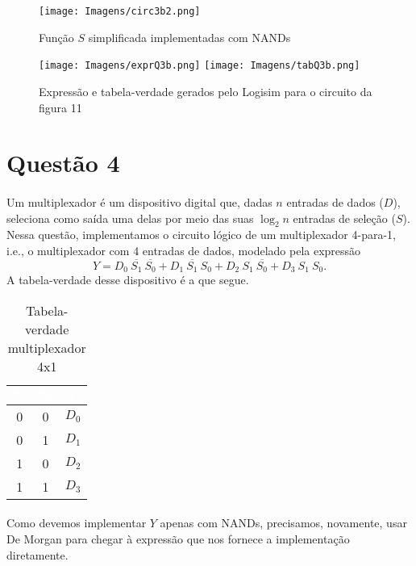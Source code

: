 \documentclass[a4paper, 12pt]{article}
\begin{document}
\begin{figure}[H]
    \centering
    \texttt{[image: Imagens/circ3b2.png]}
    \caption{Função $S$ simplificada implementadas com NANDs}
\end{figure}

\begin{figure}[H]
    \centering
    \texttt{[image: Imagens/exprQ3b.png]}
    \texttt{[image: Imagens/tabQ3b.png]} \\
    \caption{Expressão e tabela-verdade gerados pelo Logisim para o circuito da figura 11}
\end{figure}

\section{Questão 4}
\paragraph{}
Um multiplexador é um dispositivo digital que, dadas $n$ entradas de dados ($D$), seleciona como saída uma delas por meio das suas $\log_2n$ entradas de seleção ($S$). Nessa questão, implementamos o circuito lógico de um multiplexador 4-para-1, i.e., o multiplexador com 4 entradas de dados, modelado pela expressão
\[
Y = D_0 \ \overline{S_1} \ \overline{S_0} + D_1 \ \overline{S_1} \ S_0 + D_2 \ S_1 \ \overline{S_0} + D_3 \ S_1 \ S_0.
\]
A tabela-verdade desse dispositivo é a que segue.

\begin{table}[H]
    \centering
    \begin{tabular}{|c|c|c|}
        \hline
        \rowcolor{black}
        \textcolor{white}{$S_1$} & \textcolor{white}{$S_0$} & \textcolor{white}{$Y$} \\ \hline
        0 & 0 & $D_0$ \\ \hline
        \rowcolor{lightgray}
        0 & 1 & $D_1$ \\ \hline
        1 & 0 & $D_2$ \\ \hline
        \rowcolor{lightgray}
        1 & 1 & $D_3$ \\ \hline
    \end{tabular}
    \caption{Tabela-verdade multiplexador 4x1}
\end{table}

\paragraph{}
Como devemos implementar $Y$ apenas com NANDs, precisamos, novamente, usar De Morgan para chegar à expressão que nos fornece a implementação diretamente.
\end{document}
